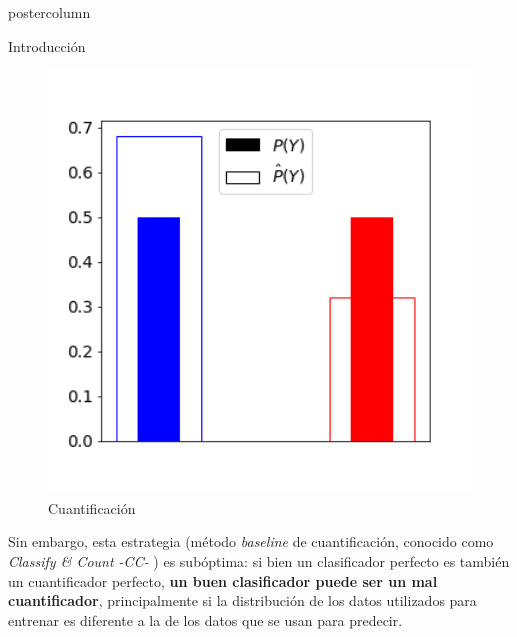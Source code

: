 \documentclass{beamer}
\begin{document}
\begin{frame}
\begin{columns}
\begin{column}{.43\textwidth}
\begin{beamercolorbox}[center]{postercolumn}
\begin{minipage}{.98\textwidth}
{\begin{myblock}{Introducción}
\begin{figure}
							\begin{minipage}{0.375\textwidth}
								\centering\includegraphics[width=1\textwidth]{../plots_teoria/intro_barplot.png}
								\caption{Cuantificación}
							\end{minipage}
						\end{figure}
						Sin embargo, esta estrategia (método {\it baseline} de cuantificación, conocido como
						{\it Classify \& Count -CC-\/ }) es subóptima: si bien un clasificador perfecto es
						también un cuantificador perfecto, \textbf{un buen clasificador puede ser un mal cuantificador},
						principalmente si la distribución de los datos utilizados para entrenar es diferente
						a la de los datos que se usan para predecir.
					\end{myblock}\vfill

}
\end{minipage}
\end{beamercolorbox}
\end{column}
\end{columns}
\end{frame}
\end{document}
